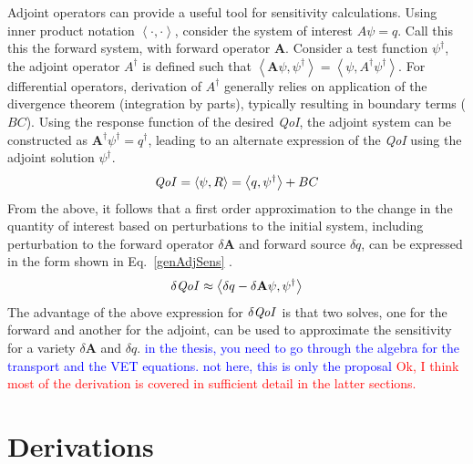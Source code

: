 \documentclass[12pt]{report}
\newcommand{\bra}{\left\langle}
\newcommand{\ket}{\right\rangle}
\newcommand{\qoi}{{\it QoI}\xspace}
\newcommand{\comment}[2]{\marginpar{\textcolor{#2}{$\star$}}\textcolor{#2}{#1}\newline}
\newcommand{\iwh}[1]{\comment{#1}{red}}
\newcommand{\jcr}[1]{\comment{#1}{blue}}
\newcommand{\iwh}[1]{\phantom{a}}
\newcommand{\jcr}[1]{\phantom{a}}
\begin{document}
Adjoint operators can provide a useful tool for sensitivity calculations. Using inner product notation $\bra \cdot , \cdot \ket$, consider the system of interest $A \psi = q$. Call this this the forward system, with forward operator $\mathbf{A}$. Consider a test function $\psi^\dag$, the adjoint operator $A^\dag$ is defined such that $\bra \mathbf{A} \psi, \psi^\dag \ket = \bra \psi, A^\dag \psi^\dag \ket $. For differential operators, derivation of $A^\dag$ generally relies on application of the divergence theorem (integration by parts), typically resulting in boundary terms ($BC$). Using the response function of the desired \qoi, the adjoint system can be constructed as $\mathbf{A^\dag} \psi^\dag = q^\dag$, leading to an alternate expression of the \qoi using the adjoint solution $\psi^\dag $.
\begin{equation}
\label{genAdjQoI}
\qoi = \bra \psi, R \ket = \bra q , \psi^\dag \ket + BC
\end{equation} 
From the above, it follows that a first order approximation to the change in the quantity of interest based on perturbations to the initial system, including perturbation to the forward operator $\delta \mathbf{A}$ and forward source $\delta q$, can be expressed in the form shown in Eq.~\eqref{genAdjSens} \cite{Marchuk}.
\begin{equation}
\label{genAdjSens}
\delta \qoi \approx \bra \delta q - \delta \mathbf{A} \psi , \psi^\dag \ket 
\end{equation}
The advantage of the above expression for $\delta \qoi$ is that two solves, one for the forward and another for the adjoint, can be used to approximate the sensitivity for a variety $\delta \mathbf{A}$ and $\delta q$.
\jcr{in the thesis, you need to go through the algebra for the transport and the VET equations. not here, this is only the proposal}
\iwh{Ok, I think most of the derivation is covered in sufficient detail in the latter sections.}
 
%
%
%
%



\chapter{Derivations}
\end{document}
